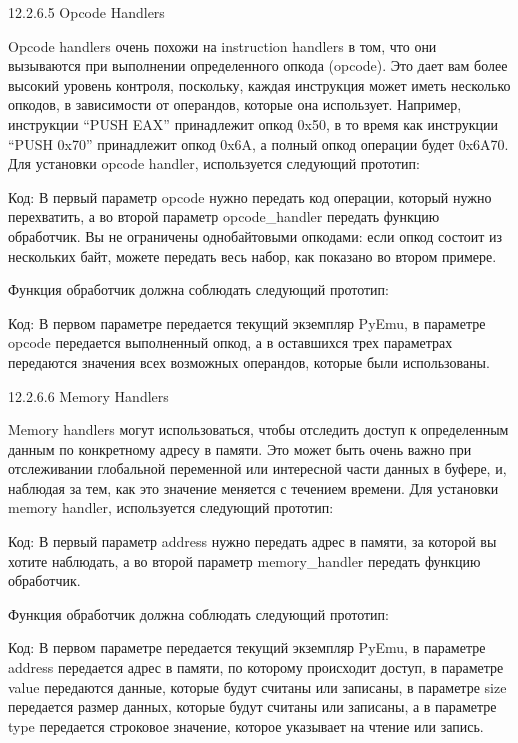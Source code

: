\documentclass[12pt]{book}
\begin{document}
12.2.6.5 Opcode Handlers

Opcode handlers очень похожи на instruction handlers в том, что они вызываются при выполнении определенного опкода (opcode). Это дает вам более высокий уровень контроля, поскольку, каждая инструкция может иметь несколько опкодов, в зависимости от операндов, которые она использует. Например, инструкции “PUSH EAX” принадлежит опкод 0x50, в то время как инструкции “PUSH 0x70” принадлежит опкод 0x6A, а полный опкод операции будет 0x6A70. Для установки opcode handler, используется следующий прототип:

Код:
В первый параметр opcode нужно передать код операции, который нужно перехватить, а во второй параметр opcode\_handler передать функцию обработчик. Вы не ограничены однобайтовыми опкодами: если опкод состоит из нескольких байт, можете передать весь набор, как показано во втором примере. 

Функция обработчик должна соблюдать следующий прототип:

Код:
В первом параметре передается текущий экземпляр PyEmu, в параметре opcode передается выполненный опкод, а в оставшихся трех параметрах передаются значения всех возможных операндов, которые были использованы. 

12.2.6.6 Memory Handlers

Memory handlers могут использоваться, чтобы отследить доступ к определенным данным по конкретному адресу в памяти. Это может быть очень важно при отслеживании глобальной переменной или интересной части данных в буфере, и, наблюдая за тем, как это значение меняется с течением времени. Для установки memory handler, используется следующий прототип:

Код:
В первый параметр address нужно передать адрес в памяти, за которой вы хотите наблюдать, а во второй параметр memory\_handler передать функцию обработчик.

Функция обработчик должна соблюдать следующий прототип:

Код:
В первом параметре передается текущий экземпляр PyEmu, в параметре address передается адрес в памяти, по которому происходит доступ, в параметре value передаются данные, которые будут считаны или записаны, в параметре size передается размер данных, которые будут считаны или записаны, а в параметре type передается строковое значение, которое указывает на чтение или запись.
\end{document}

